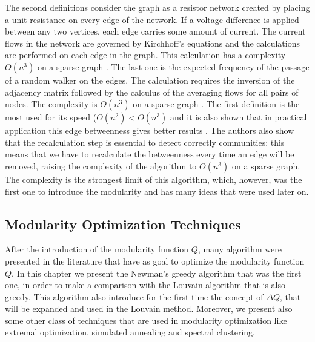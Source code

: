 The second definitions consider the graph as a resistor network created by placing a unit resistance on every edge of the network.
If a voltage difference is applied between any two vertices, each edge carries some amount of current.
The current flows in the network are governed by Kirchhoff’s equations and the calculations are performed on each edge in the graph.
This calculation has a complexity $O(n^3)$ on a sparse graph \cite{Newman_2004}. 
The last one is the expected frequency of the passage of a random walker on the edges. The calculation requires the inversion of the adjacency matrix followed by the calculus of the averaging flows for all pairs of nodes. The complexity is $O(n^3)$ on a sparse graph \cite{Newman_2004}. 
The first definition is the most used for its speed ($O(n^2) < O(n^3)$ and it is also shown that in practical application this edge betweenness gives better results \cite{Newman_2004}. The authors also show that the recalculation step is essential to detect correctly communities: this means that we have to recalculate the betweenness every time an edge will be removed, raising the complexity of the algorithm to $O(n^3)$ on a sparse graph. The complexity is the strongest limit of this algorithm, which, however, was the first one to introduce the modularity and has many ideas that were used later on.
\subsection{Modularity Optimization Techniques}
After the introduction of the modularity function $Q$, many algorithm were presented in the literature that have as goal to optimize the modularity function $Q$. In this chapter we present the Newman's greedy algorithm that was the first one, in order to make a comparison with the Louvain algorithm that is also greedy. This algorithm also introduce for the first time the concept of $\Delta Q$, that will be expanded and used in the Louvain method. Moreover, we present also some other class of techniques that are used in modularity optimization like extremal optimization, simulated annealing and spectral clustering.

